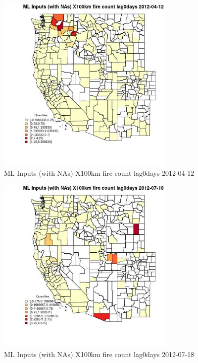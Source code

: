 \begin{figure} 
\centering  
\includegraphics[width=0.77\textwidth]{Code_Outputs/Report_ML_input_PM25_Step4_part_e_de_duplicated_aves_compiled_2019-05-14wNAs_CountyX100km_fire_count_lag0daysMean2012-04-12_2012-04-12.jpg} 
\caption{\label{fig:Report_ML_input_PM25_Step4_part_e_de_duplicated_aves_compiled_2019-05-14wNAsCountyX100km_fire_count_lag0daysMean2012-04-12_2012-04-12}ML Inputs (with NAs) X100km fire count lag0days 2012-04-12} 
\end{figure} 
 

\begin{figure} 
\centering  
\includegraphics[width=0.77\textwidth]{Code_Outputs/Report_ML_input_PM25_Step4_part_e_de_duplicated_aves_compiled_2019-05-14wNAs_CountyX100km_fire_count_lag0daysMean2012-07-18_2012-07-18.jpg} 
\caption{\label{fig:Report_ML_input_PM25_Step4_part_e_de_duplicated_aves_compiled_2019-05-14wNAsCountyX100km_fire_count_lag0daysMean2012-07-18_2012-07-18}ML Inputs (with NAs) X100km fire count lag0days 2012-07-18} 
\end{figure} 
 

